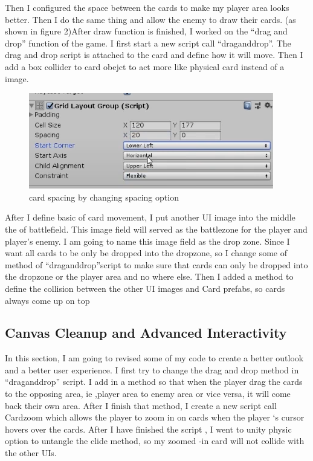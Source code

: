 \documentclass[10pt,twocolumn]{article}
\begin{document}
Then I configured the space between the cards to make my player area looks better. Then I do the same thing and allow the enemy to draw their cards. (as shown in figure 2)After draw function is finished, I worked on the “drag and drop” function of the game. I first start a new script call “draganddrop”. The drag and drop script is attached to the card and define how it will move. Then I add a box collider to card obejct to act more like physical card instead of a image.
\begin{figure}[ht]
  \includegraphics[width=\linewidth]{cardspacing.png}
  \caption{card spacing by changing spacing option }
  \label{fig:cardspacing}
\end{figure}
	After I define basic of card movement, I put another UI image into the middle the of battlefield. This image field will served as the battlezone for the player and player’s enemy. I am going to name this image field as the drop zone. Since I want all cards to be only be dropped into the dropzone, so I change some of method of  “draganddrop”script to make sure that cards can only be dropped into the dropzone or the player area and no where else. Then I added a method to define the collision between the other UI images and Card prefabs, so cards always come up on top
\subsection{Canvas Cleanup and Advanced Interactivity}
In this section, I am going to revised some of my code to create a better outlook and a better user experience.
I first try to change the drag and drop method in “draganddrop” script. I add in a method so that when the player drag the cards to the opposing area, ie ,player area to enemy  area  or vice versa, it will come back their own area.
After I finish that method, I create a new script call Cardzoom which allows the player to zoom in on cards when the player ‘s cursor hovers over the cards. After I have finished the script , I went to unity physic option to untangle the clide method, so my zoomed -in card will not collide with the other UIs.
\end{document}
